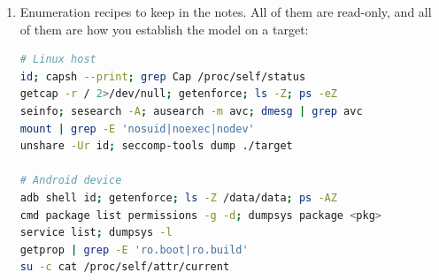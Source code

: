 \documentclass[12pt]{Training}
\begin{document}
\begin{enumerate}
\begin{enumerate}
    \end{enumerate}
    \item Enumeration recipes to keep in the notes. All of them are read-only, and all of them are how you establish the model on a target:
    \begin{sectionbox}
    \begin{lstlisting}[language=bash, caption={Model enumeration recipes (Linux host / Android device / the policy files).}]
# Linux host
id; capsh --print; grep Cap /proc/self/status
getcap -r / 2>/dev/null; getenforce; ls -Z; ps -eZ
seinfo; sesearch -A; ausearch -m avc; dmesg | grep avc
mount | grep -E 'nosuid|noexec|nodev'
unshare -Ur id; seccomp-tools dump ./target

# Android device
adb shell id; getenforce; ls -Z /data/data; ps -AZ
cmd package list permissions -g -d; dumpsys package <pkg>
service list; dumpsys -l
getprop | grep -E 'ro.boot|ro.build'
su -c cat /proc/self/attr/current


\end{lstlisting}
\end{sectionbox}
\end{enumerate}
\end{document}
